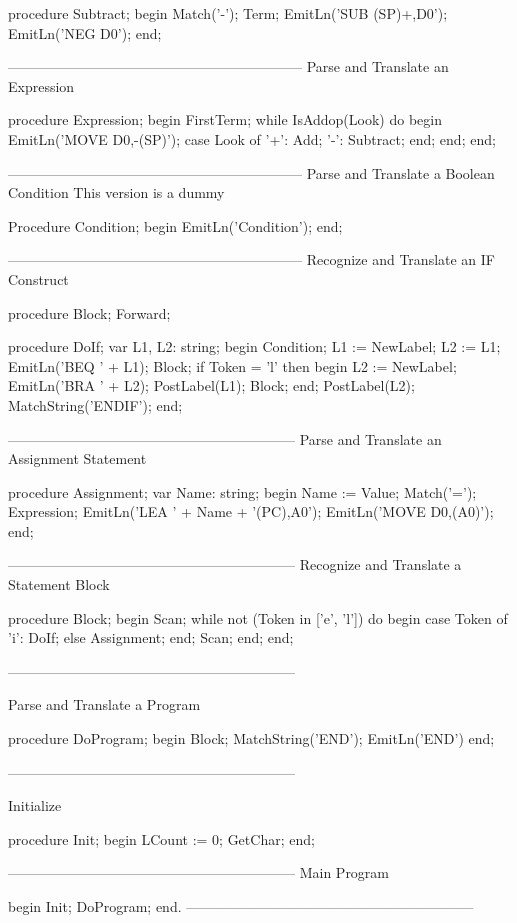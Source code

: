 \documentclass[float=false, crop=false]{standalone}
\begin{document}
\begin{code}
procedure Subtract;
begin
   Match('-');
   Term;
   EmitLn('SUB (SP)+,D0');
   EmitLn('NEG D0');
end;


{---------------------------------------------------------------}
{ Parse and Translate an Expression }

procedure Expression;
begin
   FirstTerm;
   while IsAddop(Look) do begin
      EmitLn('MOVE D0,-(SP)');
      case Look of
       '+': Add;
       '-': Subtract;
      end;
   end;
end;


{---------------------------------------------------------------}
{ Parse and Translate a Boolean Condition }
{ This version is a dummy }

Procedure Condition;
begin
   EmitLn('Condition');
end;


{---------------------------------------------------------------}
{ Recognize and Translate an IF Construct }

procedure Block; Forward;


procedure DoIf;
var L1, L2: string;
begin
   Condition;
   L1 := NewLabel;
   L2 := L1;
   EmitLn('BEQ ' + L1);
   Block;
   if Token = 'l' then begin
      L2 := NewLabel;
      EmitLn('BRA ' + L2);
      PostLabel(L1);
      Block;
   end;
   PostLabel(L2);
   MatchString('ENDIF');
end;


{--------------------------------------------------------------}
{ Parse and Translate an Assignment Statement }

procedure Assignment;
var Name: string;
begin
   Name := Value;
   Match('=');
   Expression;
   EmitLn('LEA ' + Name + '(PC),A0');
   EmitLn('MOVE D0,(A0)');
end;


{--------------------------------------------------------------}
{ Recognize and Translate a Statement Block }

procedure Block;
begin
   Scan;
   while not (Token in ['e', 'l']) do begin
      case Token of
       'i': DoIf;
       else Assignment;
      end;
      Scan;
   end;
end;


{--------------------------------------------------------------}

{ Parse and Translate a Program }

procedure DoProgram;
begin
   Block;
   MatchString('END');
   EmitLn('END')
end;


{--------------------------------------------------------------}

{ Initialize }

procedure Init;
begin
   LCount := 0;
   GetChar;
end;


{--------------------------------------------------------------}
{ Main Program }

begin
   Init;
   DoProgram;
end.
{--------------------------------------------------------------}
\end{code}
\end{document}
